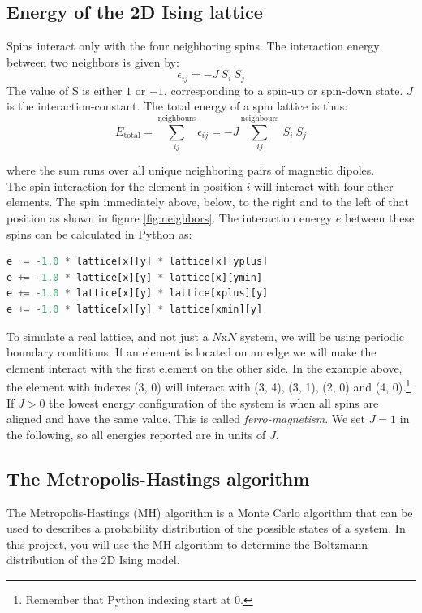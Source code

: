 \documentclass{article}
\begin{document}
\subsection{Energy of the 2D Ising lattice}
\label{section:energy}
Spins interact only with the four neighboring spins. The interaction energy between two neighbors is given by:
\begin{equation}
\epsilon_{ij} = -J \ S_i \ S_j
\end{equation} 
The value of S is either $1$ or $-1$, corresponding to a spin-up or spin-down state. $J$ is the interaction-constant.
The total energy of a spin lattice is thus:
\begin{equation}
E_{\mathrm{total}}=\sum^{\mathrm{neighbours}}_{ij} \epsilon_{ij} = -J \sum^{\mathrm{neighbours}}_{ij} \ S_i \ S_j
\end{equation}

where the sum runs over all unique neighboring pairs of magnetic dipoles.\\

The spin interaction for the element in position $i$ will interact with four other elements.
The spin immediately above,
below, to the right and to the left of that position
as shown in figure \ref{fig:neighbors}.
The interaction energy $e$ between these spins can be calculated in Python as:
\begin{lstlisting}[language=python]
e  = -1.0 * lattice[x][y] * lattice[x][yplus]
e += -1.0 * lattice[x][y] * lattice[x][ymin]
e += -1.0 * lattice[x][y] * lattice[xplus][y]
e += -1.0 * lattice[x][y] * lattice[xmin][y]
\end{lstlisting}


To simulate a real lattice, and not just a $N$x$N$ system, we will be using
periodic boundary conditions.
If an element is located on an edge 
we will make the element interact with the first element on the other side.
In the example above, the element with
indexes (3, 0) will interact with (3, 4), (3, 1), (2, 0) and (4, 0).\footnote{Remember that Python
indexing start at 0.}\\

If $J > 0$ the lowest energy configuration of the system is when all spins are
aligned and have the same value.
This is called \textit{ferro-magnetism}.
We set $J = 1$ in the following, so all energies reported are in units of $J$.

\subsection{The Metropolis-Hastings algorithm}
The Metropolis-Hastings (MH) algorithm is a Monte Carlo algorithm that can be used
to describes a probability distribution of the possible states of a system.
In this project, you will use the MH algorithm to determine the Boltzmann
distribution of the 2D Ising model.\\
\end{document}
